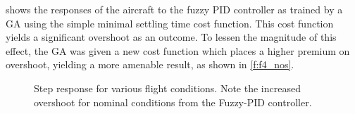  shows the responses of the aircraft to the fuzzy PID controller as
trained by a GA using the simple minimal settling time cost function. This cost function yields a significant
overshoot as an outcome. To lessen the magnitude of this effect, the GA was given a new cost function which
places a higher premium on overshoot, yielding a more amenable result, as shown in \cref{f:f4_nos}.

\begin{figure}[ht]
    \centering
    \begin{subfigmatrix}{2}
    \end{subfigmatrix} \caption{Step response for various flight conditions. Note the increased overshoot for
                                nominal conditions from the Fuzzy-PID controller.}\label{f:f4}
\end{figure}

